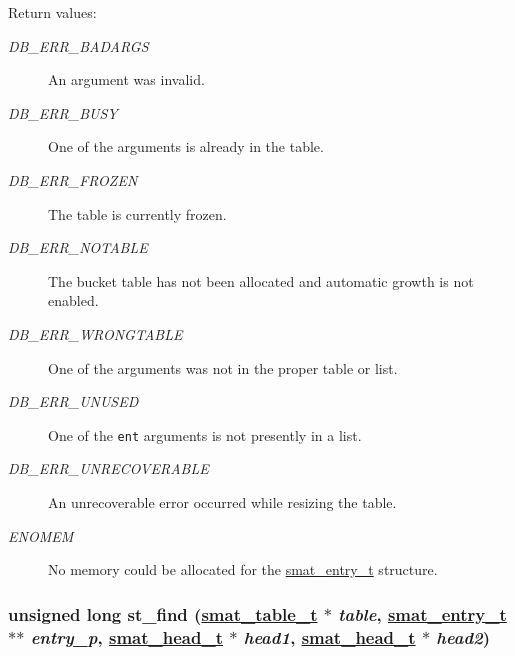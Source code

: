 \begin{Desc}
\item[Return values: ]\par
\begin{description}
\item[{\em 
DB\_\-ERR\_\-BADARGS}]An argument was invalid. \item[{\em 
DB\_\-ERR\_\-BUSY}]One of the arguments is already in the table. \item[{\em 
DB\_\-ERR\_\-FROZEN}]The table is currently frozen. \item[{\em 
DB\_\-ERR\_\-NOTABLE}]The bucket table has not been allocated and automatic growth is not enabled. \item[{\em 
DB\_\-ERR\_\-WRONGTABLE}]One of the arguments was not in the proper table or list. \item[{\em 
DB\_\-ERR\_\-UNUSED}]One of the {\tt ent} arguments is not presently in a list. \item[{\em 
DB\_\-ERR\_\-UNRECOVERABLE}]An unrecoverable error occurred while resizing the table. \item[{\em 
ENOMEM}]No memory could be allocated for the \hyperlink{group__dbprim__smat_a2}{smat\_\-entry\_\-t} structure. \end{description}
\end{Desc}
\hypertarget{group__dbprim__smat_a12}{
\subsubsection[st\_\-find]{\setlength{\rightskip}{0pt plus 5cm}unsigned long st\_\-find (\hyperlink{group__dbprim__smat_a0}{smat\_\-table\_\-t} $\ast$ {\em table}, \hyperlink{group__dbprim__smat_a2}{smat\_\-entry\_\-t} $\ast$$\ast$ {\em entry\_\-p}, \hyperlink{group__dbprim__smat_a1}{smat\_\-head\_\-t} $\ast$ {\em head1}, \hyperlink{group__dbprim__smat_a1}{smat\_\-head\_\-t} $\ast$ {\em head2})}}
\label{group__dbprim__smat_a12}


